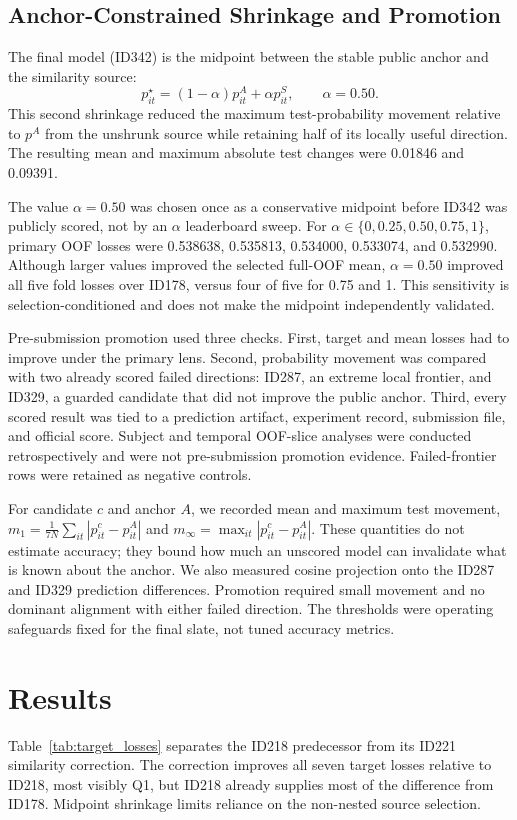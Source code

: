 \documentclass[conference]{IEEEtran}
\begin{document}
\subsection{Anchor-Constrained Shrinkage and Promotion}
The final model (ID342) is the midpoint between the stable public anchor and the similarity source:
\begin{equation}
p^{\star}_{it}=(1-\alpha)p^{A}_{it}+\alpha p^{S}_{it},\qquad \alpha=0.50.
\end{equation}
This second shrinkage reduced the maximum test-probability movement relative to $p^A$ from the unshrunk source while retaining half of its locally useful direction. The resulting mean and maximum absolute test changes were 0.01846 and 0.09391.

The value $\alpha=0.50$ was chosen once as a conservative midpoint before ID342 was publicly scored, not by an $\alpha$ leaderboard sweep. For $\alpha\in\{0,0.25,0.50,0.75,1\}$, primary OOF losses were 0.538638, 0.535813, 0.534000, 0.533074, and 0.532990. Although larger values improved the selected full-OOF mean, $\alpha=0.50$ improved all five fold losses over ID178, versus four of five for 0.75 and 1. This sensitivity is selection-conditioned and does not make the midpoint independently validated.

Pre-submission promotion used three checks. First, target and mean losses had to improve under the primary lens. Second, probability movement was compared with two already scored failed directions: ID287, an extreme local frontier, and ID329, a guarded candidate that did not improve the public anchor. Third, every scored result was tied to a prediction artifact, experiment record, submission file, and official score. Subject and temporal OOF-slice analyses were conducted retrospectively and were not pre-submission promotion evidence. Failed-frontier rows were retained as negative controls.

For candidate $c$ and anchor $A$, we recorded mean and maximum test movement, $m_1=\frac{1}{7N}\sum_{it}|p^c_{it}-p^A_{it}|$ and $m_\infty=\max_{it}|p^c_{it}-p^A_{it}|$. These quantities do not estimate accuracy; they bound how much an unscored model can invalidate what is known about the anchor. We also measured cosine projection onto the ID287 and ID329 prediction differences. Promotion required small movement and no dominant alignment with either failed direction. The thresholds were operating safeguards fixed for the final slate, not tuned accuracy metrics.

\section{Results}
Table~\ref{tab:target_losses} separates the ID218 predecessor from its ID221 similarity correction. The correction improves all seven target losses relative to ID218, most visibly Q1, but ID218 already supplies most of the difference from ID178. Midpoint shrinkage limits reliance on the non-nested source selection.
\end{document}
